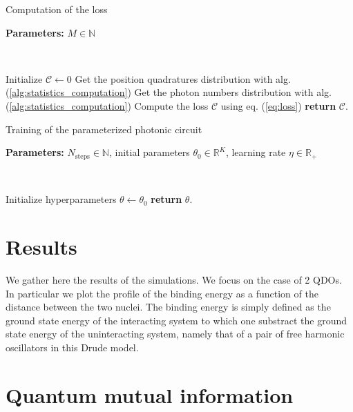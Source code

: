\documentclass[reprint, amsmath, amssymb, aps]{revtex4-2}
\begin{document}
    \begin{algorithm}
        \caption{Computation of the loss}\label{alg:loss_computation}
            \textbf{Parameters:} $M\in\mathbb N$

            \

            Initialize $\mathcal C \gets 0$\;
            Get the position quadratures distribution with alg. (\ref{alg:statistics_computation})\;
            Get the photon numbers distribution with alg. (\ref{alg:statistics_computation})\;
            Compute the loss $\mathcal C$ using eq. (\ref{eq:loss})\;
            \textbf{return} $\mathcal C$.
    \end{algorithm}

    \begin{algorithm}
        \caption{Training of the parameterized photonic circuit}\label{alg:training}
        \textbf{Parameters:} $N_\text{steps}\in\mathbb N$, initial parameters $\theta_0\in\mathbb R^K$, learning rate $\eta\in\mathbb R_+$

        \

        Initialize hyperparameters $\theta \gets \theta_0$\;
        \textbf{return} $\theta$.
    \end{algorithm}

\section{Results}
    We gather here the results of the simulations. We focus on the case of 2 QDOs. In particular we plot the profile of the binding energy as a function of the distance between the two nuclei. The binding energy is simply defined as the ground state energy of the interacting system to which one substract the ground state energy of the uninteracting system, namely that of a pair of free harmonic oscillators in this Drude model.

\section{Quantum mutual information}
\end{document}
